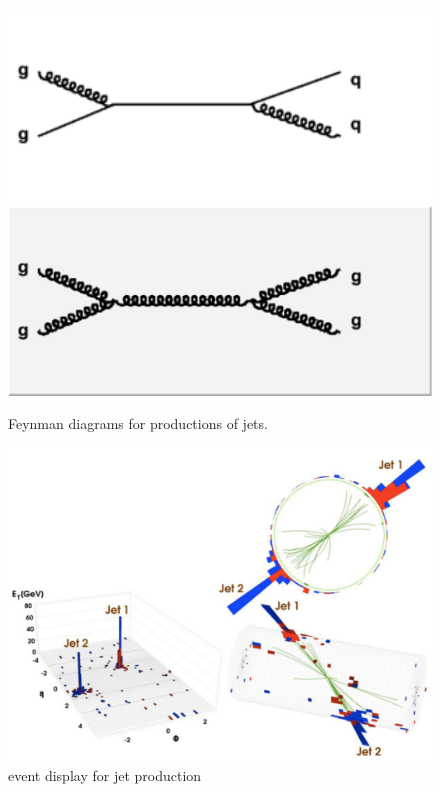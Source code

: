 \begin{figure}[h]
\centering\includegraphics[scale=0.5]{./protonprotoncollisions/Pictures/fig8.pdf}
\centering\includegraphics[scale=0.5]{./protonprotoncollisions/Pictures/fig7.pdf}
\caption{Feynman diagrams for productions of jets.}
\label{fig:jetfeyn}
\end{figure}


\begin{figure}[h]
\centering\includegraphics[scale=0.5]{./protonprotoncollisions/Pictures/fig9.pdf}
\caption{event display for jet production}
\label{fig:jetdis1}
\end{figure}


